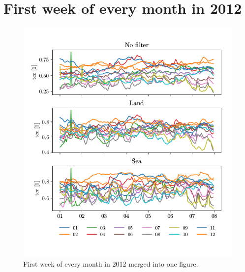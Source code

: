\chapter{First week of every month in 2012}

\begin{figure}[ht]
    \centering
    \includegraphics{python_figs/spatially_averaged_one_week_tcc_seperated_by_filters.png}
    \caption{First week of every month in 2012 merged into one figure.}
    \label{fig:all_first_week_one_figure}
\end{figure}


